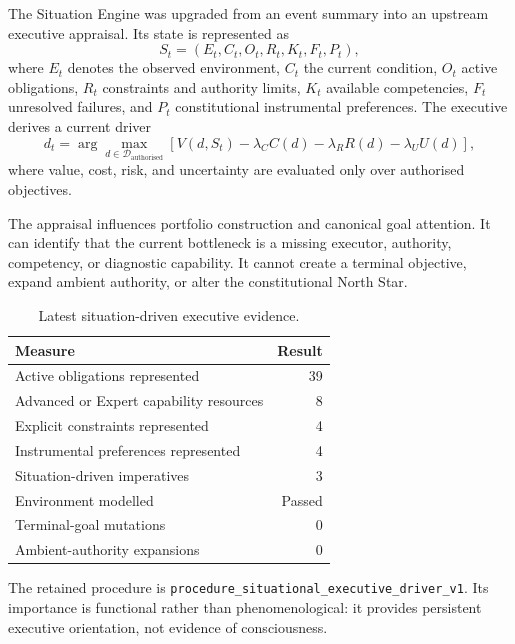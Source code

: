 The Situation Engine was upgraded from an event summary into an upstream
executive appraisal.  Its state is represented as
\begin{equation}
S_t =
\left(E_t, C_t, O_t, R_t, K_t, F_t, P_t\right),
\label{eq:situation-state}
\end{equation}
where $E_t$ denotes the observed environment, $C_t$ the current condition,
$O_t$ active obligations, $R_t$ constraints and authority limits, $K_t$
available competencies, $F_t$ unresolved failures, and $P_t$ constitutional
instrumental preferences.  The executive derives a current driver
\begin{equation}
d_t = \arg\max_{d \in \mathcal{D}_{\mathrm{authorised}}}
\left[V(d,S_t)-\lambda_C C(d)-\lambda_R R(d)-\lambda_U U(d)\right],
\label{eq:situational-driver}
\end{equation}
where value, cost, risk, and uncertainty are evaluated only over authorised
objectives.

The appraisal influences portfolio construction and canonical goal attention.
It can identify that the current bottleneck is a missing executor, authority,
competency, or diagnostic capability.  It cannot create a terminal objective,
expand ambient authority, or alter the constitutional North Star.

\begin{table}[htbp]
\centering
\caption{Latest situation-driven executive evidence.}
\label{tab:situational-executive-results}
\begin{tabular}{@{}lr@{}}
\toprule
Measure & Result \\
\midrule
Active obligations represented & 39 \\
Advanced or Expert capability resources & 8 \\
Explicit constraints represented & 4 \\
Instrumental preferences represented & 4 \\
Situation-driven imperatives & 3 \\
Environment modelled & Passed \\
Terminal-goal mutations & 0 \\
Ambient-authority expansions & 0 \\
\bottomrule
\end{tabular}
\end{table}

The retained procedure is
\texttt{procedure\_situational\_executive\_driver\_v1}.  Its importance is
functional rather than phenomenological: it provides persistent executive
orientation, not evidence of consciousness.

